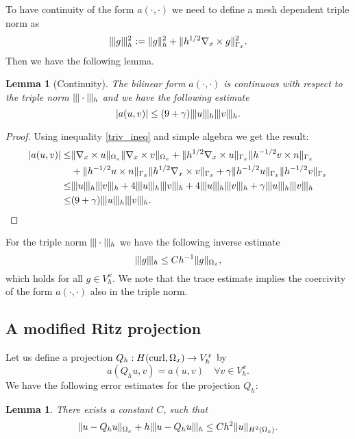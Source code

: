\documentclass[reqno,a4paper]{amsart}
\newtheorem{lemma}[theorem]{Lemma}
\theoremstyle{remark}
\numberwithin{equation}{section}
\newcommand{\norm}[1]{\|#1\|}
\newcommand{\Tnorm}[1]{|\mkern-1mu|\mkern-1mu|#1|\mkern-1mu|\mkern-1mu|}
\def\curl{\nabla_x \times }
\begin{document}
To have continuity of the form $a(\cdot,\cdot)$
we need to define a mesh dependent triple norm as 
\[
\Tnorm{g}^2_h := \norm{g}^2_h + \norm{h^{1/2} \curl g}^2_{\Gamma_x}.
\]
Then we have the following lemma.
\begin{lemma} [Continuity] \label{contLemma}
The bilinear form $a(\cdot,\cdot)$ is continuous
with respect to the triple norm $\Tnorm{\cdot}_h$ and we have the following estimate
\[
|a(u, v)|\leq (9 + \gamma) \Tnorm{u}_h \Tnorm{v}_h. 
\]
\end{lemma}
\begin{proof}
Using inequality \eqref{triv_ineq} and simple algebra we get the result:
\[
\begin{aligned}
|a(u, v)| \leq& \norm{\curl u}_{\Omega_x} \norm{\curl v}_{\Omega_x}
+ \norm{h^{1/2} \curl u}_{\Gamma_x} \norm{h^{-1/2} v \times n}_{\Gamma_x} \\
& + \norm{h^{-1/2} u \times n}_{\Gamma_x} \norm{h^{1/2} \curl v}_{\Gamma_x}
+ \gamma \norm{h^{-1/2} u}_{\Gamma_x} \norm{h^{-1/2} v}_{\Gamma_x} \\
\leq& \Tnorm{u}_h \Tnorm{v}_h + 4\Tnorm{u}_h \Tnorm{v}_h
+ 4 \Tnorm{u}_h \Tnorm{v}_h + \gamma \Tnorm{u}_h \Tnorm{v}_h \\
\leq& (9 + \gamma) \Tnorm{u}_h \Tnorm{v}_h.
\end{aligned}
\]
\end{proof}
For the triple norm $ \Tnorm{\cdot}_h $ we have the following inverse estimate
\[
\Tnorm{g}_h \leq C h^{-1} \norm{g}_{\Omega_x},
\]
which holds for all $ g \in V^x_h $.
We note that the trace estimate implies the coercivity of the form $a(\cdot,\cdot)$
also in the triple norm.

\subsection{A modified Ritz projection}

Let us define a projection $ Q_h : H(\textnormal{curl}, \Omega_x) \rightarrow V^x_h $ by
\begin{equation*} %
a(Q_h u, v) = a(u, v) \quad \forall v \in V^x_h.
\end{equation*}
We have the following error estimates for the projection $ Q_h $:
\begin{lemma} \label{projlemma}
There exists a constant $ C $, such that
\begin{equation}
\norm{u - Q_h u}_{\Omega_x} + h\Tnorm{u - Q_h u}_h \leq C h^2 \norm{u}_{H^2(\Omega_x)}.
\end{equation}
\end{lemma}
\end{document}
